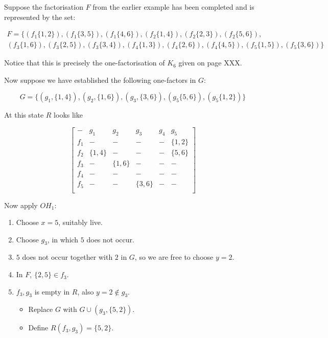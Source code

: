 \documentclass[11pt, a4paper]{book}\usepackage[]{graphicx}\usepackage[]{xcolor}
\newcounter{example}
\begin{document}
\begin{example}
Suppose the factorisation $F$ from the earlier example has
been completed and is represented by the set:

\begin{equation}
  \begin{split}
    F = \{(f_1\{1,2\}),(f_1\{3,5\}),(f_1\{4,6\}),(f_2\{1,4\}),(f_2\{2,3\}),(f_2\{5,6\}), \\
    (f_3\{1,6\}),(f_3\{2,5\}),(f_3\{3,4\}),(f_4\{1,3\}),(f_4\{2,6\}),(f_4\{4,5\}),(f_5\{1,5\}),(f_5\{3,6\})\}
  \end{split}
\end{equation}

Notice that this is precisely the one-factorisation of $K_6$
given on page XXX.

Now suppose we have established the following one-factors in
$G$:

\begin{equation}
  G = \{(g_1, \{1, 4\}), (g_2, \{1, 6\}), (g_3, \{3, 6\}), (g_5\{5, 6\}), (g_5\{1, 2\})\}
\end{equation}

At this state $R$ looks like 

\begin{equation}
  \begin{bmatrix}
     -  &   g_1    &    g_2    &    g_3   & g_4 &    g_5    \\
    f_1 &     -    &     -     &    -     &  -  & \{1, 2\}  \\
    f_2 & \{1, 4\} &     -     &    -     &  -  & \{5, 6\}  \\
    f_3 &     -    &  \{1, 6\} &    -     &  -  &     -     \\
    f_4 &     -    &     -     &    -     &  -  &     -     \\
    f_5 &     -    &     -     & \{3, 6\} &  -  &     -     \\
  \end{bmatrix}
\end{equation}

Now apply $OH_1$:

\begin{enumerate}
  \item{Choose $x = 5$, suitably live.}
  \item{Choose $g_3$, in which $5$ does not occur.}
  \item{$5$ does not occur together with $2$ in $G$, so we are
     free to choose $y = 2$.}
  \item{In $F$, $\{2, 5\} \in f_3$.}
  \item{
    $f_3, g_3$ is empty in $R$, also $y = 2 \notin g_3$.
    \begin{itemize}
       \item{Replace $G$ with $G \cup (g_3, \{5, 2\})$.}
       \item{Define $R(f_3, g_3) = \{5, 2\}$.}
    \end{itemize}
  }
\end{enumerate}


\end{example}
\end{document}

